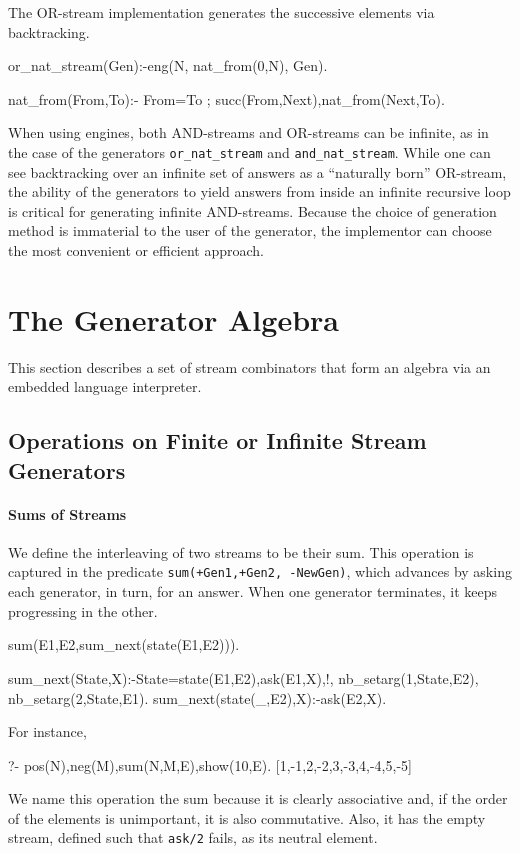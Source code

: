\documentclass{new_tlp}
\begin{document}
The OR-stream implementation generates the successive elements via backtracking.
\begin{code}
or_nat_stream(Gen):-eng(N, nat_from(0,N), Gen).

nat_from(From,To):- From=To ; succ(From,Next),nat_from(Next,To).
\end{code}

When using engines, 
both AND-streams and OR-streams can be infinite, as in the
case of the generators {\tt or\_nat\_stream} and {\tt and\_nat\_stream}.
While one can see backtracking over an infinite set of answers as
a ``naturally born'' OR-stream, the ability of the generators to
yield answers from inside an infinite recursive loop is critical
for generating infinite AND-streams.
Because the choice of generation method is immaterial to the user of the generator,
the implementor can choose the most convenient or efficient approach.

\section{The Generator Algebra}\label{alg}

This section describes a set of stream combinators that form an algebra via an
embedded language interpreter.
 
\subsection{Operations on Finite or Infinite Stream Generators}

\paragraph{Sums of Streams}

We define the interleaving of two streams to be their sum. This operation is
captured in the predicate {\tt sum(+Gen1,+Gen2, -NewGen)}, which advances by
asking each generator, in turn, for an answer. When one generator terminates,
it keeps progressing in the other.
\begin{code}
sum(E1,E2,sum_next(state(E1,E2))).

sum_next(State,X):-State=state(E1,E2),ask(E1,X),!,
  nb_setarg(1,State,E2),
  nb_setarg(2,State,E1).
sum_next(state(_,E2),X):-ask(E2,X).
\end{code}
For instance,
\begin{codex}
?- pos(N),neg(M),sum(N,M,E),show(10,E).
[1,-1,2,-2,3,-3,4,-4,5,-5]
\end{codex}
We name this operation the sum because it is clearly associative and, if the
order of the elements is unimportant, it is also commutative.  Also, it has
the empty stream, defined such that {\tt ask/2} fails, as its neutral element.
\end{document}
